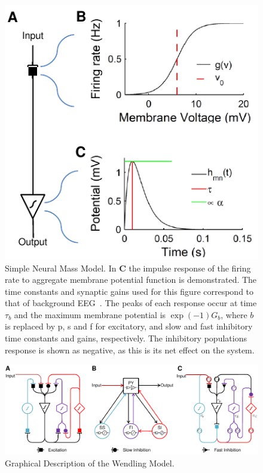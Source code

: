 \documentclass{article}%
\begin{document}
\begin{figure}
	\centering
		\includegraphics{Biological_Response.pdf}
	\caption{Simple Neural Mass Model. In \textbf{C} the impulse response of the firing rate to aggregate membrane potential function is demonstrated. The time constants and synaptic gains used for this figure correspond to that of background EEG~\citep{wendling2002epileptic}. The peaks of each response occur at time $\tau_{b}$ and the maximum membrane potential is $\exp(-1)G_{b}$, where $b$ is replaced by p, s and f for excitatory, and slow and fast inhibitory time constants and gains, respectively. The inhibitory populations response is shown as negative, as this is its net effect on the system.}
	\label{fig: Simple}
\end{figure}

 \begin{figure}
 	\centering
 		\includegraphics{fig/Biological_Model.pdf}
 	\caption{Graphical Description of the Wendling Model.}
 	\label{fig: Biological}
 \end{figure}
\end{document}
